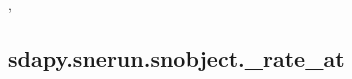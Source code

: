 \documentclass[letterpaper,10pt,english]{sphinxmanual}
\begin{document}
\begin{fulllineitems}
\begin{quote}
\begin{description}
\end{description}\end{quote}



\begin{description}
\item[{, }] \leavevmode
\end{description}



\end{fulllineitems}



\subsection{sdapy.snerun.snobject.\_rate\_at}
\label{\detokenize{generated/sdapy.snerun.snobject._rate_at:sdapy-snerun-snobject-rate-at}}\label{\detokenize{generated/sdapy.snerun.snobject._rate_at::doc}}
\end{document}
